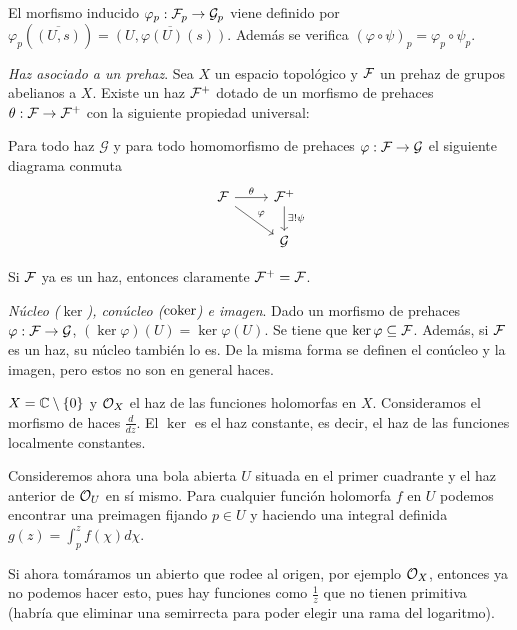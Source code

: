\documentclass[GA.tex]{subfiles}
\begin{document}
El morfismo inducido $\varphi_p:\mathcal{F}_p\to \mathcal{G}_p$ viene definido por $\varphi_p(\overline{(U,s)})=\overline{(U, \varphi(U)(s))}$. Además se verifica $(\varphi\circ\psi)_p=\varphi_p\circ \psi_p$. 


\begin{defi}[Proposición]
\emph{Haz asociado a un prehaz}. Sea $X$ un espacio topológico y $\mathcal{F}$ un prehaz de grupos abelianos a $X$. Existe un haz $\mathcal{F}^+$ dotado de un morfismo de prehaces $\theta:\mathcal{F}\to\mathcal{F}^+$ con la siguiente propiedad universal:

Para todo haz $\mathcal{G}$ y para todo homomorfismo de prehaces $\varphi:\mathcal{F}\to\mathcal{G}$ el siguiente diagrama conmuta
\[
\begin{tikzcd}
\calF\arrow[r,"\theta"] \arrow[dr, "\varphi"]& \calF^+\arrow[d, "\exists!\psi"]\\
& \mathcal{G}
\end{tikzcd}
\]

\end{defi}

Si $\mathcal{F}$ ya es un haz, entonces claramente $\mathcal{F}^+=\mathcal{F}$.

\begin{defi}
\emph{Núcleo ($\ker$), conúcleo ($\operatorname{coker}$) e imagen}. Dado un morfismo de prehaces $\varphi:\mathcal{F}\to \mathcal{G}$,  $(\ker\varphi)(U)=\ker\varphi(U)$. Se tiene que $\ker\varphi\subseteq \mathcal{F}$. Además, si $\mathcal{F}$ es un haz, su núcleo también lo es.  De la misma forma se definen el conúcleo y la imagen, pero estos no son en general haces. 
\end{defi}

\begin{ej}
$X=\mathbb{C}\setminus\{0\}$ y ${\mathcal O}_X$ el haz de las funciones holomorfas en $X$. Consideramos el morfismo de haces $\frac{d}{dz}$. El $\ker$ es el haz constante, es decir, el haz de las funciones localmente constantes. 

Consideremos ahora una bola abierta $U$ situada en el primer cuadrante y el haz anterior de ${\mathcal O}_U$ en sí mismo. Para cualquier función holomorfa $f$ en $U$ podemos encontrar una preimagen fijando $p\in U$ y haciendo una integral definida $g(z)=\int_p^zf(\chi)d\chi$. 

Si ahora tomáramos un abierto que rodee al origen, por ejemplo ${\mathcal O}_X$, entonces ya no podemos hacer esto, pues hay funciones como $\frac{1}{z}$ que no tienen primitiva (habría que eliminar una semirrecta para poder elegir una rama del logaritmo).  
\end{ej}
\end{document}
